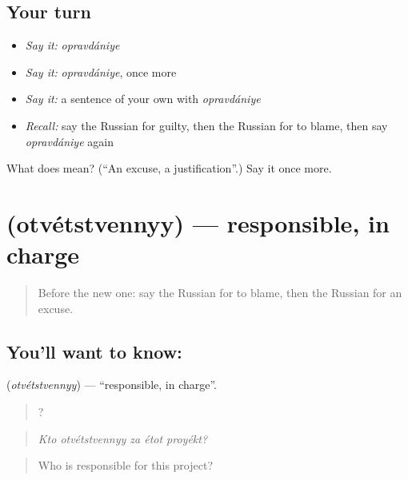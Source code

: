 \subsection*{Your turn}
\begin{itemize}
\raggedright
  \item \emph{Say it:} \emph{opravdániye}
  \item \emph{Say it:} \emph{opravdániye}, once more
  \item \emph{Say it:} a sentence of your own with \emph{opravdániye}
  \item \emph{Recall:} say the Russian for guilty, then the Russian for to blame, then say \emph{opravdániye} again
\end{itemize}

\begin{tcolorbox}[breakable,colback=teal!4,colframe=teal!35!black,title={Before you move on}]
What does  mean? (\textquotedblleft{}An excuse, a justification\textquotedblright{}.) Say it once more.
\end{tcolorbox}
\section[\texorpdfstring{\ru{ответственный} (otvétstvennyy)}{ответственный (otvétstvennyy)}]{ (otvétstvennyy) — responsible, in charge}

\label{lesson:RU-C352-otvetstvennyy}



\begin{quote}
Before the new one: say the Russian for to blame, then the Russian for an excuse.
\end{quote}

\subsection*{You'll want to know: }
\textbf{} (\emph{otvétstvennyy}) — \textquotedblleft{}responsible, in charge\textquotedblright{}.

\begin{quote}
    ?
\end{quote}

\begin{quote}
\emph{Kto otvétstvennyy za étot proyékt?}
\end{quote}

\begin{quote}
Who is responsible for this project?
\end{quote}

